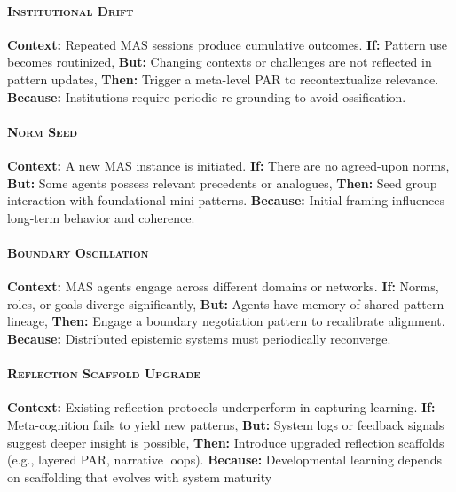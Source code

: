 \documentclass[acmlarge,timestamp]{acmart}
\begin{document}
\paragraph*{{\scshape Institutional Drift}}
\noindent \textbf{Context:} Repeated MAS sessions produce cumulative outcomes.
\textbf{If:} Pattern use becomes routinized,
\textbf{But:} Changing contexts or challenges are not reflected in pattern updates,
\textbf{Then:} Trigger a meta-level PAR to recontextualize relevance.
\textbf{Because:} Institutions require periodic re-grounding to avoid ossification.

\paragraph*{{\scshape Norm Seed}}
\noindent \textbf{Context:}  A new MAS instance is initiated.
\textbf{If:} There are no agreed-upon norms,
\textbf{But:} Some agents possess relevant precedents or analogues,
\textbf{Then:} Seed group interaction with foundational mini-patterns.
\textbf{Because:} Initial framing influences long-term behavior and coherence.

\paragraph*{{\scshape Boundary Oscillation}}
\noindent \textbf{Context:}  MAS agents engage across different domains or networks.
\textbf{If:} Norms, roles, or goals diverge significantly,
\textbf{But:} Agents have memory of shared pattern lineage,
\textbf{Then:} Engage a boundary negotiation pattern to recalibrate alignment.
\textbf{Because:} Distributed epistemic systems must periodically reconverge.

\paragraph*{{\scshape Reflection Scaffold Upgrade}}
\noindent \textbf{Context:}  Existing reflection protocols underperform in capturing learning.
\textbf{If:} Meta-cognition fails to yield new patterns,
\textbf{But:} System logs or feedback signals suggest deeper insight is possible,
\textbf{Then:} Introduce upgraded reflection scaffolds (e.g., layered PAR, narrative loops).
\textbf{Because:} Developmental learning depends on scaffolding that evolves with system maturity



\renewcommand\bibname{References}
\renewcommand\refname{References}



\end{document}
